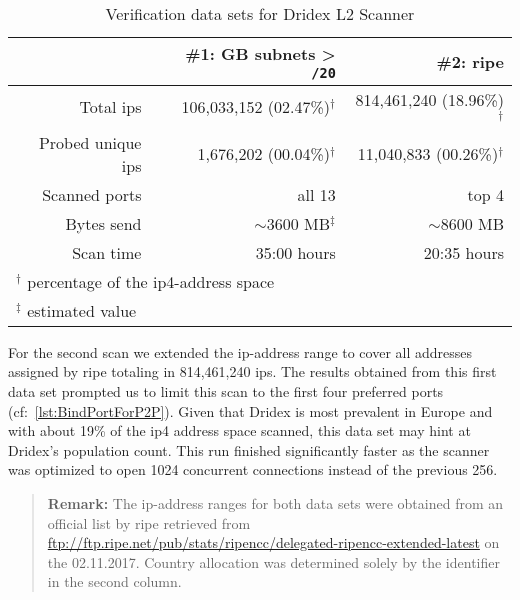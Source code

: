 \begin{table}
    \centering
    \begin{tabular}{rrr}
        \toprule
        &
        \#1: GB subnets > \texttt{/20} &
        \#2: \gls{ripe} \\
        \midrule
        Total \gls{ip}s &
        106,033,152 (02.47\%)\(^\dag\) &
        814,461,240 (18.96\%)\(^\dag\)\\

        Probed unique \gls{ip}s &
        1,676,202 (00.04\%)\(^\dag\) &
        11,040,833 (00.26\%)\(^\dag\)\\

        Scanned ports &
        all 13 &
        top 4\\

        Bytes send &
        \({\sim}\)3600 MB\(^\ddag\) &
        \({\sim}\)8600 MB\\

        Scan time &
        35:00 hours &
        20:35 hours\\
        \bottomrule
        \multicolumn{3}{l}{\(^\dag\) percentage of the \gls{ip4}-address space} \\
        \multicolumn{3}{l}{\(^\ddag\) estimated value} \\
    \end{tabular}
    \caption{Verification data sets for Dridex L2 Scanner\label{tab:DataSets}}
\end{table}

For the second scan we extended the \gls{ip}-address range to cover all addresses assigned by \gls{ripe} totaling in 814,461,240 \gls{ip}s.
The results obtained from this first data set prompted us to limit this scan to the first four preferred ports (cf:~\autoref{lst:BindPortForP2P}).
Given that Dridex is most prevalent in Europe and with about 19\% of the \gls{ip4} address space scanned, this data set may hint at Dridex's population count.
This run finished significantly faster as the scanner was optimized to open 1024 concurrent connections instead of the previous 256.

\begin{quote}
\textbf{Remark:} The \gls{ip}-address ranges for both data sets were obtained from an official list by \gls{ripe} retrieved from \url{ftp://ftp.ripe.net/pub/stats/ripencc/delegated-ripencc-extended-latest} on the 02.11.2017.
Country allocation was determined solely by the identifier in the second column.
\end{quote}


